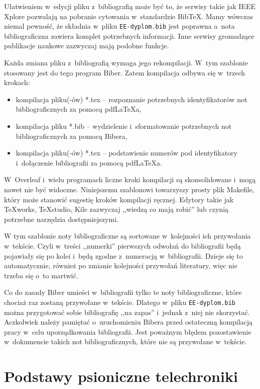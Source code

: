 Ułatwieniem w~edycji pliku z~bibliografią może być to, że serwisy takie jak IEEE Xplore pozwalają na pobranie cytowania w~standardzie BibTeX. Mamy wówczas niemal pewność, że składnia w~pliku \texttt{EE-dyplom.bib} jest poprawna a~nota bibliograficzna zawiera komplet potrzebnych informacji. Inne serwisy gromadzące publikacje naukowe zazwyczaj mają podobne funkcje.

Każda zmiana pliku z~bibliografią wymaga jego rekompilacji. W~tym szablonie stosowany jest do tego program Biber. Zatem kompilacja odbywa się w~trzech krokach:
\begin{itemize}
	\item kompilacja pliku(-ów) *.tex -- rozpoznanie potrzebnych identyfikatorów not bibliograficznych za pomocą pdf\LaTeX{a},
	\item kompilacja pliku *.bib -- wydzielenie i~sformatowanie potrzebnych not bibliograficznych za pomocą Bibera,
	\item kompilacja pliku(-ów) *.tex -- podstawienie numerów pod identyfikatory i~dołączenie bibliografii za pomocą pdf\LaTeX{a}.
\end{itemize}
W~Overleaf i~wielu programach liczne kroki kompilacji są skonsolidowane i~mogą nawet nie być widoczne. Niniejszemu szablonowi towarzyszy prosty plik Makefile, który może stanowić sugestię kroków kompilacji ręcznej. Edytory takie jak TeXworks, TeXstudio, Kile zazwyczaj ,,wiedzą co mają robić'' lub czynią potrzebne narzędzia dostępniejszymi.

W tym szablonie noty bibliograficzne są sortowane w~kolejności ich przywołania w~tekście. Czyli w~treści ,,numerki'' pierwszych odwołań do bibliografii będą pojawiały się po kolei i~będą zgodne z~numeracją w~bibliografii. Dzieje się to automatycznie, również po zmianie kolejności przywołań literatury, więc nie trzeba się o~to martwić.

Co do zasady Biber umieści w~bibliografii tylko te noty bibliograficzne, które chociaż raz zostaną przywołane w~tekście. Dlatego w~pliku \texttt{EE-dyplom.bib} można przygotować sobie bibliografię ,,na zapas'' i~jednak z~niej nie skorzystać. Aczkolwiek należy pamiętać o~uruchomieniu Bibera przed ostateczną kompilacją pracy w~celu uporządkowania bibliografii. Jest poważnym błędem pozostawienie w~dokumencie takich not bibliograficznych, które nie są przywołane w~tekście.

\section{Podstawy psioniczne telechroniki}

